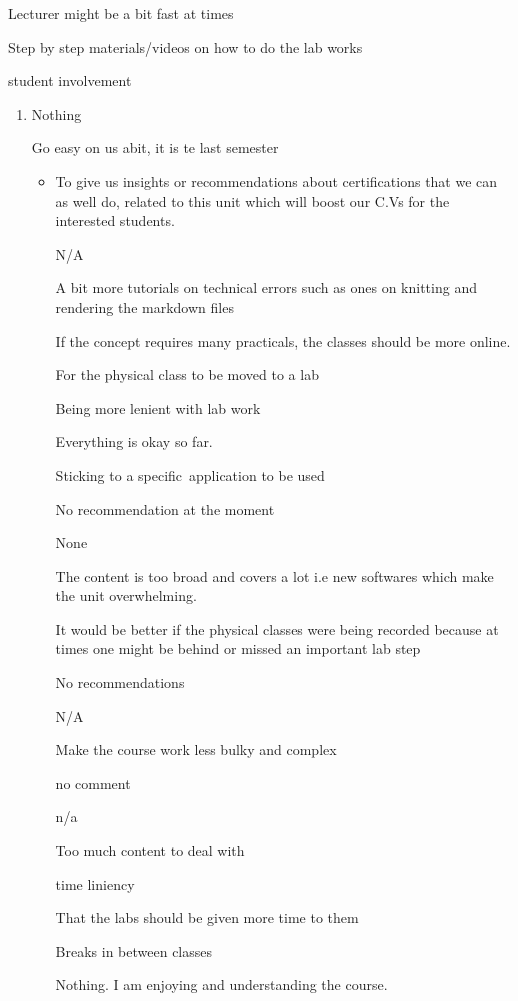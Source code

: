 \documentclass[
]{article}
\providecommand{\tightlist}{%
  \setlength{\itemsep}{0pt}\setlength{\parskip}{0pt}}
\begin{document}
Lecturer might be a bit fast at times

Step by step materials/videos on how to do the lab works~

student involvement~~

\begin{enumerate}
\def\labelenumi{\arabic{enumi}.}
\tightlist
\item
  Nothing

  Go easy on us abit, it is te last semester

  \begin{itemize}
  \tightlist
  \item
    To give us insights or recommendations about certifications that we
    can as well do, related to this unit which will boost our C.Vs for
    the interested students.~

    N/A

    A bit more tutorials on technical errors such as ones on knitting
    and rendering the markdown files

    If the concept requires many practicals, the classes should be more
    online.

    For the physical class to be moved to a lab

    Being more lenient with lab work

    Everything is okay so far.

    Sticking to a specific~application to be used

    No recommendation at the moment

    None

    The content is too broad and covers a lot i.e new softwares which
    make the unit overwhelming.

    It would be better if the physical classes were being recorded
    because at times one might be behind or missed an important lab step
    ~

    No recommendations

    N/A

    Make the course work less bulky and complex

    no comment

    n/a

    Too much content to deal with

    time liniency

    That the labs should be given more time to them~

    Breaks in between classes

    Nothing. I am enjoying and understanding the course.


\end{itemize}
\end{enumerate}
\end{document}
